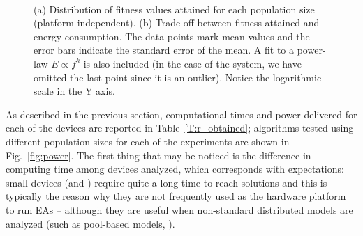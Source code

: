 \begin{figure}[!t]
~~
\caption{(a) Distribution of fitness values attained for each population size (platform independent). 
(b) Trade-off between fitness attained and energy consumption. The
data points mark mean values and the error bars indicate the standard
error of the mean. A fit to a power-law $E\propto f^k$ is also
included (in the case of the \blade system, we have omitted the last
point since it is an outlier).%
 Notice the logarithmic scale in the Y
axis. 
\label{fig:fitnessenergy}}
\end{figure}

As described in the previous section, computational times and power
delivered for each of the devices are reported in
Table~\ref{T:r_obtained}; algorithms tested using
different population sizes for each of the experiments are shown in
Fig.~\ref{fig:power}.  The
first thing that may be noticed is the difference in computing time
among devices analyzed, which corresponds with expectations:  small
devices (\raspberry and \tabletnsp) require quite a long time to reach
solutions and this is typically the reason why they are not frequently
used as the hardware platform to run EAs -- although they are useful
when non-standard distributed models are analyzed (such as pool-based
models, \cite{pool}). 

